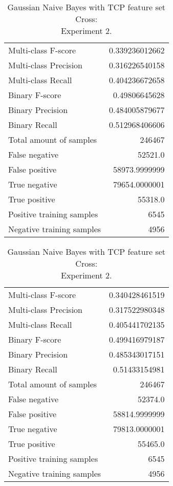 \begin{table}[H]
\begin{minipage}{0.5\textwidth}
\caption{Gaussian Naive Bayes with TCP feature set Cross: \\Experiment 1.}
\centering
\begin{tabular}{l r}
\toprule
Multi-class F-score & 0.339236012662 \\
Multi-class Precision & 0.316226540158 \\
Multi-class Recall & 0.404236672658 \\
\midrule
Binary F-score & 0.49806645628 \\
Binary Precision & 0.484005879677 \\
Binary Recall & 0.512968406606 \\
\midrule
Total amount of samples & 246467 \\
False negative & 52521.0 \\
False positive & 58973.9999999 \\
True negative & 79654.0000001 \\
True positive & 55318.0 \\
\midrule
Positive training samples & 6545 \\
Negative training samples & 4956 \\
\bottomrule
\end{tabular}
\end{minipage}
\hfillx
\begin{minipage}{0.5\textwidth}
\caption{Gaussian Naive Bayes with TCP feature set Cross: \\Experiment 2.}
\centering
\begin{tabular}{l r}
\toprule
Multi-class F-score & 0.340428461519 \\
Multi-class Precision & 0.317522980348 \\
Multi-class Recall & 0.405441702135 \\
\midrule
Binary F-score & 0.499416979187 \\
Binary Precision & 0.485343017151 \\
Binary Recall & 0.51433154981 \\
\midrule
Total amount of samples & 246467 \\
False negative & 52374.0 \\
False positive & 58814.9999999 \\
True negative & 79813.0000001 \\
True positive & 55465.0 \\
\midrule
Positive training samples & 6545 \\
Negative training samples & 4956 \\
\bottomrule
\end{tabular}
\end{minipage}
\end{table}
